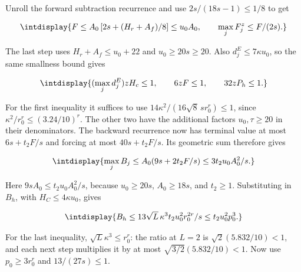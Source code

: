 
Unroll the forward subtraction recurrence and use \(2s/(18s-1)\le1/8\) to get


\begingroup\renewcommand{\theHequation}{intdisplay.609}
\begin{equation*}
\intdisplay{
F\le A_0\left[2s+(H_r+A_f)/8\right]\le u_0A_0,
\qquad \max_jF_j^z\le F/(2s).
}
\end{equation*}
\endgroup


The last step uses \(H_r+A_f\le u_0+22\) and \(u_0\ge20s\ge20\). Also \(d_j^E\le7\kappa u_0\), so the same smallness bound gives


\begingroup\renewcommand{\theHequation}{intdisplay.610}
\begin{equation*}
\intdisplay{
(\max_jd_j^E)zH_c\le1,\qquad 6zF\le1,\qquad32zP_h\le1.
}
\end{equation*}
\endgroup


For the first inequality it suffices to use \(14\kappa^2/(16\sqrt8\,\allowbreak s r_0^r)\le1\), since \(\kappa^2/r_0^r\le(3.24/10)^r\). The other two have the additional factors \(u_0,\allowbreak \tau\ge20\) in their denominators. The backward recurrence now has terminal value at most \(6s+t_2F/s\) and forcing at most \(40s+t_2F/s\). Its geometric sum therefore gives


\begingroup\renewcommand{\theHequation}{intdisplay.611}
\begin{equation*}
\intdisplay{
\max_jB_j\le A_0(9s+2t_2F/s)
                      \le3t_2u_0A_0^2/s.
}
\end{equation*}
\endgroup


Here \(9sA_0\le t_2u_0A_0^2/s\), because \(u_0\ge20s\), \(A_0\ge18s\), and \(t_2\ge1\). Substituting in \(B_h\), with \(H_C\le4\kappa u_0\), gives


\begingroup\renewcommand{\theHequation}{intdisplay.612}
\begin{equation*}
\intdisplay{
B_h\le13\sqrt L\,\kappa^3t_2u_0^2r_0^{2r}/s
                    \le t_2u_0^2p_0^3.
}
\end{equation*}
\endgroup


For the last inequality, \(\sqrt L\kappa^3\le r_0^r\): the ratio at \(L=2\) is \(\sqrt2(5.832/10)<1\), and each next step multiplies it by at most \(\sqrt{3/2}(5.832/10)<1\). Now use \(p_0\ge3r_0^r\) and \(13/(27s)\le1\).


